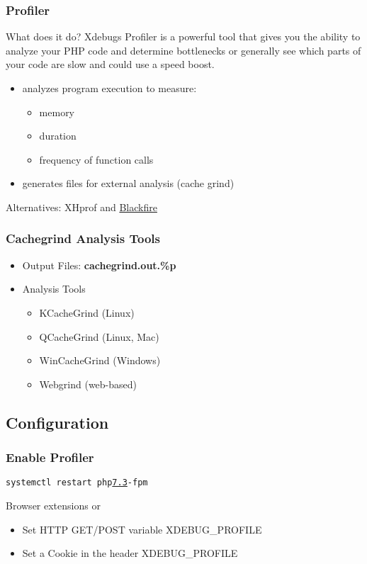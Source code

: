 \begin{frame}\frametitle{Profiler}
    \begin{block}{What does it do?}
    Xdebugs Profiler is a powerful tool that gives you the ability 
    to analyze your PHP code and determine bottlenecks or generally 
    see which parts of your code are slow and could use a speed boost.
    \end{block} \pause
    \begin{itemize}
        \item analyzes program execution to measure:
        \begin{itemize}
            \item memory
            \item duration
            \item frequency of function calls 
        \end{itemize}
        \item generates files for external analysis (cache grind)
    \end{itemize} \pause
    
    Alternatives: XHprof and \underline{Blackfire}
\end{frame}

\begin{frame}\frametitle{Cachegrind Analysis Tools}
    \begin{itemize}
        \item Output Files: {\bf cachegrind.out.\%p} \pause
        \item Analysis Tools \begin{itemize} 
                \item KCacheGrind (Linux)
                \item QCacheGrind (Linux, Mac)
                \item WinCacheGrind (Windows)
                \item Webgrind (web-based) \end{itemize}
    \end{itemize}
\end{frame}

\subsection{Configuration}
\begin{frame}\frametitle{Enable Profiler}
     \pause
    \texttt{systemctl restart php\underline{7.3}-fpm} \pause
    
    Browser extensions or
    \begin{itemize}
        \item Set HTTP GET/POST variable XDEBUG\_PROFILE
        \item Set a Cookie in the header XDEBUG\_PROFILE
    \end{itemize}
\end{frame}
